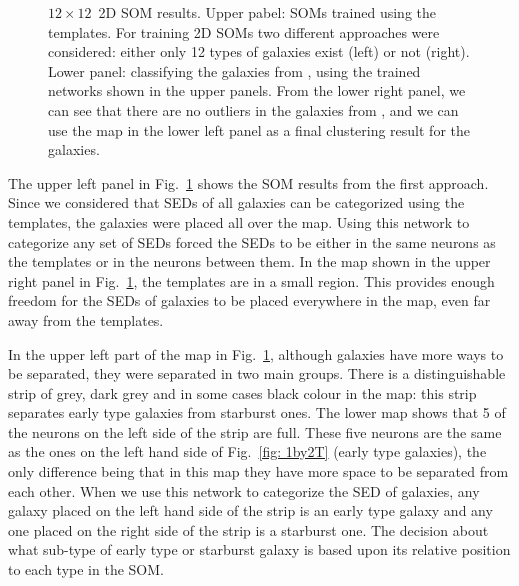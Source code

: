 \begin{figure}
\begin{subfigure}[b]{0.45\textwidth}
        \end{subfigure}
        \caption{$12\times12$~2D SOM results. Upper pabel: SOMs trained using the \citet{Kinney96} templates. For training 2D SOMs two different approaches were considered: either only 12 types of galaxies exist (left) or not (right). Lower panel: classifying the galaxies from , using the trained networks shown in the upper panels. From the lower right panel, we can see that there are no outliers in the galaxies from , and we can use the map in the lower left panel as a final clustering result for the  galaxies.}
        \label{fig: 12by12}
    \end{figure}
    
    The upper left panel in Fig.~\ref{fig: 12by12} shows the SOM results from the first approach. 
    Since we considered that SEDs of all galaxies can be categorized using the  templates, the galaxies were placed all over the map.
    Using this network to categorize any set of SEDs forced the SEDs to be either in the same neurons as the  templates or in the neurons between them.
    In the map shown in the upper right panel in Fig.~\ref{fig: 12by12}, the  templates are in a small region. This provides enough freedom for the SEDs of galaxies to be placed everywhere in the map, even far away from the templates.
    
    
    In the upper left part of the map in Fig.~\ref{fig: 12by12}, although galaxies have more ways to be separated, they were separated in two main groups.
    There is a distinguishable strip of grey, dark grey and in some cases black colour in the map:
    this strip separates early type galaxies from starburst ones.
    The lower map shows that 5 of the neurons on the left side of the strip are full. 
    These five neurons are the same as the ones on the left hand side of Fig.~\ref{fig: 1by2T} (early type galaxies),
    the only difference being that in this map they have more space to be separated from each other.
    When we use this network to categorize the SED of galaxies, any galaxy placed on the left hand side of the strip is an early type galaxy and any one placed on the right side of the strip is a starburst one.
    The decision about what sub-type of early type or starburst galaxy is based upon its relative position to each type in the SOM.
    

